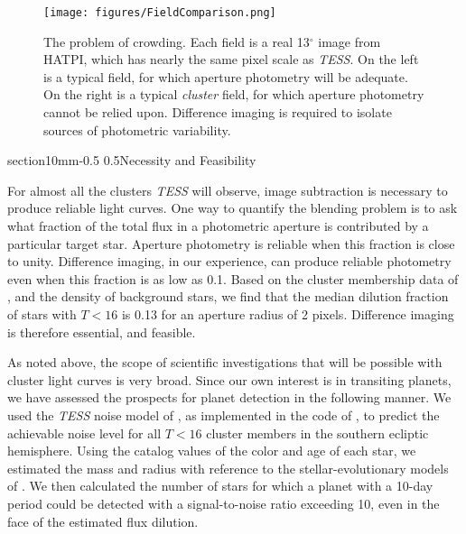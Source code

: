 \documentclass[letterpaper,11pt]{article}
\makeatletter
\renewcommand\section{\@startsection%
{section}{1}{0mm}{-0.5\baselineskip}%
{0.5\baselineskip}{\normalfont\normalsize\bfseries}}%
\makeatother
\begin{document}
\begin{figure}[!t]
    \centering
    \texttt{[image: figures/FieldComparison.png]}
    \caption{The problem of crowding. Each field is a real 13$^\circ$ image
      from HATPI, which has nearly the same pixel scale as {\it TESS}. On the 
      left
      is a typical field, for which aperture photometry will be adequate.
      On the right is a typical {\it cluster} field, for which aperture 
      photometry
      cannot be relied upon. Difference imaging is required to isolate
      sources of photometric variability.
      \label{fig:FieldComparison}}
\end{figure}

\vspace{-0.3mm}
\section{Necessity and Feasibility}
\label{sec:technical_feasibility}
\vspace{-0.3mm}

For almost all the clusters {\it TESS} will observe, image subtraction
is necessary to produce reliable light curves.  One way to quantify
the blending problem is to ask what fraction of the total flux in a
photometric aperture is contributed by a particular target star.
Aperture photometry is reliable when this fraction is close to unity.
Difference imaging, in our experience, can produce reliable photometry
even when this fraction is as low as 0.1.  Based on the cluster
membership data of \citet{Kharchenko_et_al_2013}, and the density of
background stars, we find that the median dilution fraction of stars
with $T<16$ is 0.13 for an aperture radius of 2 pixels. Difference
imaging is therefore essential, and feasible.

As noted above, the scope of scientific investigations that will be
possible with cluster light curves is very broad.  Since our own
interest is in transiting planets, we have assessed the prospects for
planet detection in the following manner.  We used the {\it TESS}
noise model of \citet{Sullivan_et_al_2015}, as implemented in the code
of \citet{Jaffe_Barclay_2017}, to predict the achievable noise
level for all $T<16$ cluster members in the southern ecliptic
hemisphere.  Using the catalog values of the color and age of each
star, we estimated the mass and radius with reference to the
stellar-evolutionary models of \citet{Siess_et_al_2000}. We then
calculated the number of stars for which a planet with a 10-day period
could be detected with a signal-to-noise ratio exceeding 10, even in
the face of the estimated flux dilution.
\end{document}
